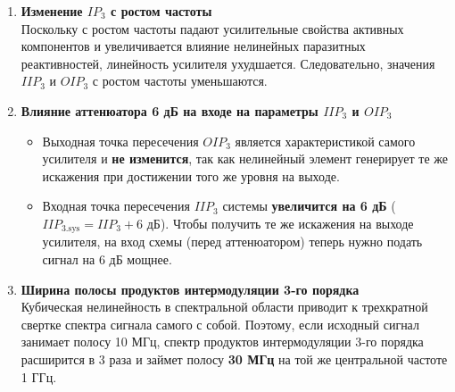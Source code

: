 \documentclass[11pt, a4paper]{article}
\begin{document}
\begin{enumerate}[label=\textbf{\arabic*.}]
    \item \textbf{Изменение $IP_3$ с ростом частоты}\\
    Поскольку с ростом частоты падают усилительные свойства активных компонентов и увеличивается влияние нелинейных паразитных реактивностей, линейность усилителя ухудшается. Следовательно, значения $IIP_3$ и $OIP_3$ с ростом частоты уменьшаются.

    \item \textbf{Влияние аттенюатора 6 дБ на входе на параметры $IIP_3$ и $OIP_3$}
    \begin{itemize}
        \item Выходная точка пересечения $OIP_3$ является характеристикой самого усилителя и \textbf{не изменится}, так как нелинейный элемент генерирует те же искажения при достижении того же уровня на выходе.
        \item Входная точка пересечения $IIP_3$ системы \textbf{увеличится на 6 дБ} ($IIP_{3\text{.sys}} = IIP_3 + 6 \text{ дБ}$). Чтобы получить те же искажения на выходе усилителя, на вход схемы (перед аттенюатором) теперь нужно подать сигнал на 6 дБ мощнее.
    \end{itemize}

    \item \textbf{Ширина полосы продуктов интермодуляции 3-го порядка}\\
    Кубическая нелинейность в спектральной области приводит к трехкратной свертке спектра сигнала самого с собой. Поэтому, если исходный сигнал занимает полосу 10 МГц, спектр продуктов интермодуляции 3-го порядка расширится в 3 раза и займет полосу \textbf{30 МГц} на той же центральной частоте 1 ГГц.


\end{enumerate}
\end{document}
